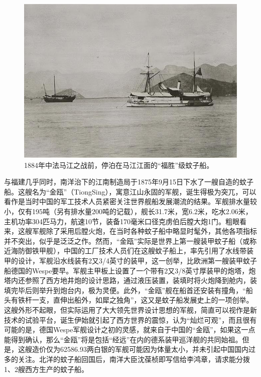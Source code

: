\documentclass[12pt,UTF8]{ctexbook}
\begin{document}
\begin{figure}[htbp]
	\centering
	\includegraphics[width=1\linewidth]{Images/9}
	\caption{1884年中法马江之战前，停泊在马江江面的“福胜”级蚊子船。}
	\label{fig:1}
\end{figure}

与福建几乎同时，南洋治下的江南制造局于1875年9月15日下水了一艘自造的蚊子船。这艘名为“金瓯”（TiongSing），寓意江山永固的军舰，诞生得极为突兀，可以看作是当时中国的军工技术人员紧密关注世界舰船发展潮流的结果。军舰排水量较小，仅有195吨（另有排水量200吨的记载），舰长31.7米，宽6.2米，吃水2.06米，主机功率304匹马力，航速10节，装备170毫米口径克虏伯后膛大炮1门。粗眼看来，这艘军舰除了采用后膛火炮，在当时各种蚊子船中略显时髦外，其他各项指标并不突出，似乎是泛泛之作。然而，“金瓯”实际是世界上第一艘装甲蚊子船（或称近海防御铁甲舰），中国的工厂技术人员们在这艘蚊子船上，率先引用了水线带装甲的设计，军舰沿水线装有2又3/4英寸的装甲，这一创举，比欧洲第一艘装甲蚊子船德国的Wespe要早。军舰主甲板上设置了一个带有2又3/8英寸厚装甲的炮塔，炮塔内还参照了西方地井炮的设计思路，通过液压装置，装填时将火炮降到舱内，装填完毕后则举升到炮台内，极为灵便。此外，“金瓯”舰在船首还安装有撞角，“船头有铁杆一支，直伸出船外，如犀之独角”，这又是蚊子船发展史上的一项创举。这艘外形不起眼，但实际运用了大大领先世界设计思想的军舰，简直可以视作是新技术的试验平台，诞生伊始就引起了西方世界的震惊，认为“灿烂可观”，而且很有可能的是，德国Wespe军舰设计之初的灵感，就来自于中国的“金瓯”，如果这一点能得到确认，那么“金瓯”将是包括“经远”在内的德系装甲巡洋舰的共同始祖。但是，这艘造价仅为62586.93两白银的军舰可能因为体量太小，并未引起中国国内过多的关注。北洋的蚊子船回国后，南洋大臣沈葆桢即写信给李鸿章，请求能分拨1、2艘西方生产的蚊子船。
\end{document}
